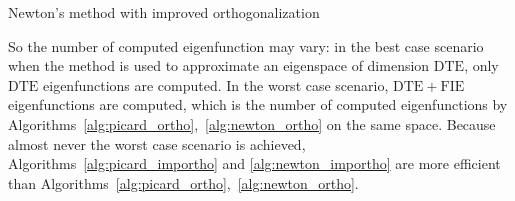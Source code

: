 \documentclass[preprint,12pt]{elsarticle}
\begin{document}
\begin{algorithm}[H] \caption{Newton's method with improved orthogonalization} \label{alg:newton_importho} 
\begin{algorithmic}

\REPEAT
{}
    \ENDFOR
    \ENDIF
\ENDIF



\end{algorithmic}
\end{algorithm}

So the number of computed eigenfunction may vary: in the best case scenario when the method is used to approximate an eigenspace of dimension $\mathrm{DTE}$, only $\mathrm{DTE}$ eigenfunctions are computed. In the worst case scenario, $\mathrm{DTE}+\mathrm{FIE}$ eigenfunctions are computed, which is the number of computed eigenfunctions by Algorithms~\ref{alg:picard_ortho},~\ref{alg:newton_ortho} on the same space. Because almost never the worst case scenario is achieved, Algorithms~\ref{alg:picard_importho} and \ref{alg:newton_importho} are more efficient than Algorithms~\ref{alg:picard_ortho},~\ref{alg:newton_ortho}.
\end{document}
